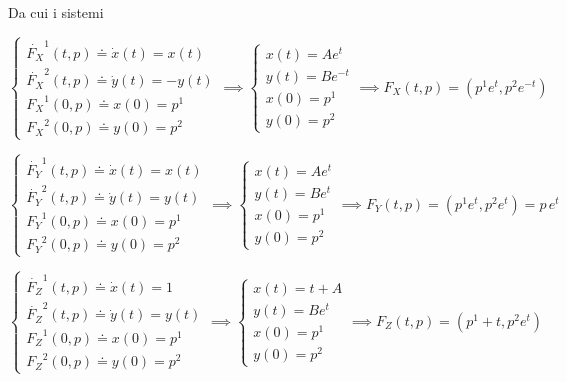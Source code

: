 {Da cui i sistemi

\begin{equation}
	\begin{cases}
		\dot{F_{X}}^{1}(t,p) \doteq \dot{x}(t) = x(t) \\
		\dot{F_{X}}^{2}(t,p) \doteq \dot{y}(t) = - y(t) \\
		{F_{X}}^{1}(0,p) \doteq x(0) = p^{1} \\
		{F_{X}}^{2}(0,p) \doteq y(0) = p^{2}
	\end{cases} %
	\implies %
	\begin{cases}
		x(t) = A e^{t} \\
		y(t) = B e^{-t} \\
		x(0) = p^{1} \\
		y(0) = p^{2}
	\end{cases} %
	\implies %
	F_{X}(t,p) = (p^{1} e^{t}, p^{2} e^{-t})
\end{equation}

\begin{equation}
	\begin{cases}
		\dot{F_{Y}}^{1}(t,p) \doteq \dot{x}(t) = x(t) \\
		\dot{F_{Y}}^{2}(t,p) \doteq \dot{y}(t) = y(t) \\
		{F_{Y}}^{1}(0,p) \doteq x(0) = p^{1} \\
		{F_{Y}}^{2}(0,p) \doteq y(0) = p^{2}
	\end{cases} %
	\implies %
	\begin{cases}
		x(t) = A e^{t} \\
		y(t) = B e^{t} \\
		x(0) = p^{1} \\
		y(0) = p^{2}
	\end{cases} %
	\implies %
	F_{Y}(t,p) = (p^{1} e^{t}, p^{2} e^{t}) = p \, e^{t}
\end{equation}

\begin{equation}
	\begin{cases}
		\dot{F_{Z}}^{1}(t,p) \doteq \dot{x}(t) = 1 \\
		\dot{F_{Z}}^{2}(t,p) \doteq \dot{y}(t) = y(t) \\
		{F_{Z}}^{1}(0,p) \doteq x(0) = p^{1} \\
		{F_{Z}}^{2}(0,p) \doteq y(0) = p^{2}
	\end{cases} %
	\implies %
	\begin{cases}
		x(t) = t + A \\
		y(t) = B e^{t} \\
		x(0) = p^{1} \\
		y(0) = p^{2}
	\end{cases} %
	\implies %
	F_{Z}(t,p) = (p^{1} + t, p^{2} e^{t})
\end{equation}

}
